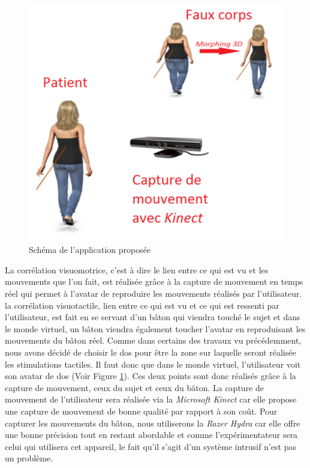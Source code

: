 \begin{figure}[!h]
   	\centerline{\includegraphics[scale=0.8]{images/schemaProposition}}
   	\caption{\label{fig10} Schéma de l'application proposée}
\end{figure}

La corrélation visuomotrice, c'est à dire le lien entre ce qui est vu et les mouvements que l'on fait, est réalisée grâce à la capture de mouvement en temps réel qui permet à l'avatar de reproduire les mouvements réalisés par l'utilisateur. la corrélation visuotactile, lien entre ce qui est vu et ce qui est ressenti par l'utilisateur, est fait en se servant d'un bâton qui viendra touché le sujet et dans le monde virtuel, un bâton viendra également toucher l'avatar en reproduisant les mouvements du bâton réel. Comme dans certains des travaux vu précédemment, nous avons décidé de choisir le dos pour être la zone sur laquelle seront réalisée les stimulations tactiles. Il faut donc que dans le monde virtuel, l'utilisateur voit son avatar de dos (Voir Figure \ref{fig10}). Ces deux points sont donc réalisés grâce à la capture de mouvement, ceux du sujet et ceux du bâton. La capture de mouvement de l'utilisateur sera réalisée via la \emph{Microsoft Kinect} car elle propose une capture de mouvement de bonne qualité par rapport à son coût. Pour capturer les mouvements du  bâton, nous utiliserons la \emph{Razer Hydra} car elle offre une bonne précision tout en restant abordable et comme l'expérimentateur sera celui qui utilisera cet appareil, le fait qu'il s'agit d'un système intrusif n'est pas un problème.\\

